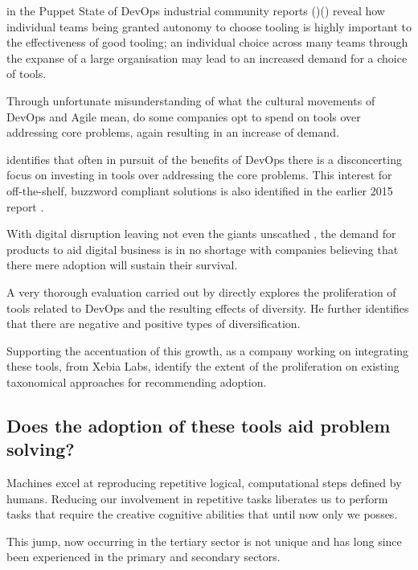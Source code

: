 \citeauthor{sodrPuppet2017} in the Puppet State of DevOps industrial community reports ()() reveal how individual teams being granted autonomy to choose tooling is highly important to the effectiveness of good tooling; an individual choice across many teams through the expanse of a large organisation may lead to an increased demand for a choice of tools.

Through unfortunate misunderstanding of what the cultural movements of DevOps and Agile mean, do some companies opt to spend on tools over addressing core problems, again resulting in an increase of demand.

\cite{sodrAccelerate2018} identifies that often in pursuit of the benefits of DevOps there is a disconcerting focus on investing in tools over addressing the core problems. This interest for off-the-shelf, buzzword compliant solutions is also identified in the earlier 2015 report \parencite{sodrPuppet2015}.

With digital disruption leaving not even the giants unscathed \parencite{weForum2016}, the demand for products to aid digital business is in no shortage with companies believing that there mere adoption will sustain their survival.

A very thorough evaluation carried out by \cite{kersten2018cambrian} directly explores the proliferation of tools related to DevOps and the resulting effects of diversity. He further identifies that there are negative and positive types of diversification.

Supporting the accentuation of this growth, as a company working on integrating these tools, \cite{xebiaLabs2019DevOpsReflections} from Xebia Labs, identify the extent of the proliferation on existing taxonomical approaches for recommending adoption.

\subsection{Does the adoption of these tools aid problem solving?}

Machines excel at reproducing repetitive logical, computational steps defined by humans. Reducing our involvement in repetitive tasks liberates us to perform tasks that require the creative cognitive abilities that until now only we posses.  

This jump, now occurring in the tertiary sector is not unique and has long since been experienced in the primary and secondary sectors. 

